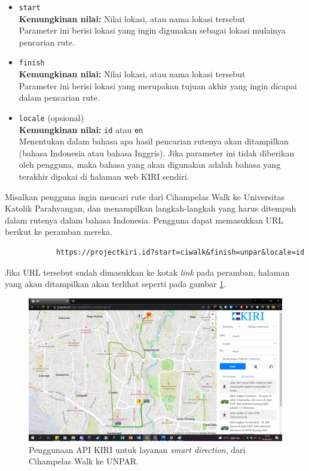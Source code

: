 \documentclass[a4paper,twoside]{article}
\begin{document}
\begin{enumerate}
\begin{itemize}
	\item \verb|start|\\
	\textbf{Kemungkinan nilai:} Nilai \latlon lokasi, atau nama lokasi tersebut\\
	Parameter ini berisi lokasi yang ingin digunakan sebagai lokasi mulainya pencarian rute.
	\item \verb|finish|\\
	\textbf{Kemungkinan nilai:} Nilai \latlon lokasi, atau nama lokasi tersebut\\
	Parameter ini berisi lokasi yang merupakan tujuan akhir yang ingin dicapai dalam pencarian rute.
	\item \verb|locale| (opsional)\\
	\textbf{Kemungkinan nilai:} \verb|id| atau \verb|en|\\
	Menentukan dalam bahasa apa hasil pencarian rutenya akan ditampilkan (bahasa Indonesia atau bahasa Inggris). Jika parameter ini tidak diberikan oleh pengguna, maka bahasa yang akan digunakan adalah bahasa yang terakhir dipakai di halaman web KIRI sendiri.
\end{itemize}
\vspace{\baselineskip}\noindent
Misalkan pengguna ingin mencari rute dari Cihampelas Walk ke Universitas Katolik Parahyangan, dan menampilkan langkah-langkah yang harus ditempuh dalam rutenya dalam bahasa Indonesia. Pengguna dapat memasukkan URL berikut ke peramban mereka.

\begin{verbatim}
            https://projectkiri.id?start=ciwalk&finish=unpar&locale=id
\end{verbatim}
\noindent
Jika URL tersebut sudah dimasukkan ke kotak \textit{link} pada peramban, halaman yang akan ditampilkan akan terlihat seperti pada gambar \ref{fig:kiri-api-smartdirections-usage}.

\begin{figure}[ht]
    \centering
    \includegraphics[width=0.74\linewidth]{apikiri-smartdirections}
    \caption[Penggunaan API KIRI untuk layanan \textit{smart direction}]{Penggunaan API KIRI untuk layanan \textit{smart direction}, dari Cihampelas Walk ke UNPAR.}
    \label{fig:kiri-api-smartdirections-usage}
\end{figure}
		

\end{enumerate}
\end{document}
